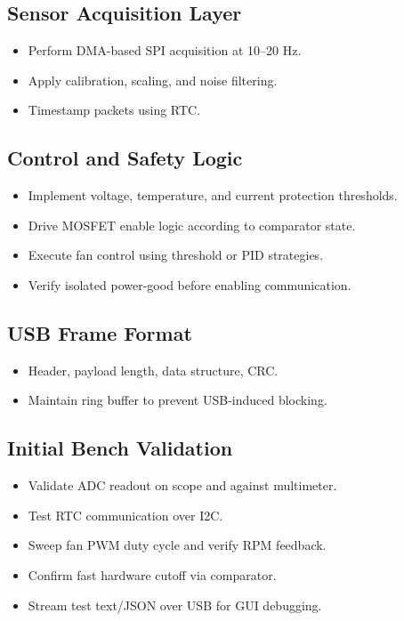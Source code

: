 \documentclass[12pt]{article}
\begin{document}
\subsection{Sensor Acquisition Layer}

\begin{itemize}
\item Perform DMA-based SPI acquisition at 10--20 Hz.
\item Apply calibration, scaling, and noise filtering.
\item Timestamp packets using RTC.
\end{itemize}

\subsection{Control and Safety Logic}

\begin{itemize}
\item Implement voltage, temperature, and current protection thresholds.
\item Drive MOSFET enable logic according to comparator state.
\item Execute fan control using threshold or PID strategies.
\item Verify isolated power-good before enabling communication.
\end{itemize}

\subsection{USB Frame Format}

\begin{itemize}
\item Header, payload length, data structure, CRC.
\item Maintain ring buffer to prevent USB-induced blocking.
\end{itemize}

\subsection{Initial Bench Validation}

\begin{itemize}
\item Validate ADC readout on scope and against multimeter.
\item Test RTC communication over I2C.
\item Sweep fan PWM duty cycle and verify RPM feedback.
\item Confirm fast hardware cutoff via comparator.
\item Stream test text/JSON over USB for GUI debugging.
\end{itemize}
\end{document}
